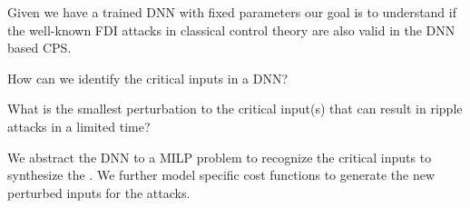 Given we have a trained DNN with fixed parameters our goal is to understand if the well-known FDI attacks in classical control theory are also valid in the DNN based CPS.
\begin{problem}
	How can we identify the critical inputs in a DNN?
\end{problem}


\begin{problem}
	What is the smallest perturbation to the critical input(s) that can result in ripple attacks in a limited time?
\end{problem}

\begin{approach*}
	We abstract the DNN to a MILP problem to recognize the critical inputs to synthesize the \attack. We further model \attack specific cost functions to generate the new perturbed inputs for the attacks. 
\end{approach*}
